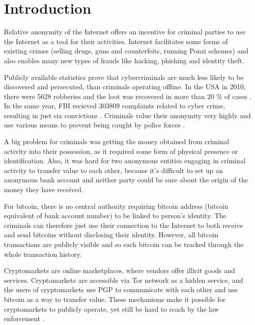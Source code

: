 \documentclass[
  digital, %
  table,   %
  lof,     %
  lot,     %
  oneside
]{fithesis3}
\begin{document}
\chapter{Introduction}

Relative anonymity of the Internet offers an incentive for criminal parties
to use the Internet as a tool for their activities.
Internet facilitates some forms of existing crimes (selling drugs, guns and
counterfeits, running Ponzi schemes) and also enables many new types of frauds like hacking, phishing and identity theft.

Publicly available statistics prove that cybercriminals are much
 less likely to be discovered and persecuted, than criminals operating offline.
 In the USA in 2010, there were 5628 robberies and the loot was recovered in more than 20 \% of cases \cite{fbi10}.
 In the same year, FBI recieved 303809 complaints related to cyber crime, resulting in just six convictions \cite{fbcyber}. 
Criminals value their anonymity very highly and use various means to prevent being caught by police forces \cite{tzanetakis2016transparency}\cite{van2013surfing}\cite{aldridge2014not}.

A big problem for criminals was getting the money obtained from criminal activity into their possession,
as it required some form of physical presence or identification.
Also, it was hard for two anonymous entities engaging in criminal activity to transfer value to each other,
 because it's difficult to set up an anonymous bank account and neither party could be sure about the origin of
 the money they have received.

For bitcoin, there is no central authority requiring bitcoin address
(bitcoin equivalent of bank account number) to be linked to person's identity. The criminals can therefore 
just use their connection to the Internet to both receive and send bitcoins without disclosing their identity.
However, all bitcoin transactions are publicly visible and so each bitcoin can be tracked through the whole transaction history.

 Cryptomarkets are online marketplaces, where vendors offer illicit goods and services.
 Cryptomarkets are accessible via Tor network as a hidden service, and the users of
 cryptomarkets use PGP to communicate with each other and use bitcoin as a way to transfer value.
These mechanisms make it possible for cryptomarkets
to publicly operate, yet still be hard to reach by the law enforcement \cite{cox2016staying}.
\end{document}
